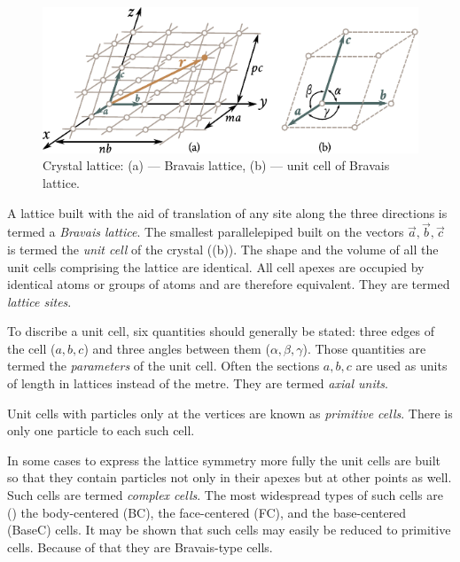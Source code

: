 \begin{figure}[t]
	\begin{center}
		\includegraphics[scale=1]{figures/ch_01/fig_1_11.pdf}
		\caption[]{Crystal lattice: (a) --- Bravais lattice, (b) --- unit cell of Bravais lattice.}
		\label{fig:1_11}
	\end{center}
	\vspace{-0.7cm}
\end{figure}

A lattice built with the aid of translation of any site along the three directions is termed a \textit{Bravais lattice}. The smallest parallelepiped built on the vectors $\vec{a}, \vec{b}, \vec{c}$ is termed the \textit{unit cell} of the crystal ((b)). The shape and the volume of all the unit cells comprising the lattice are identical. All cell apexes are occupied by identical atoms or groups of atoms and are therefore equivalent. They are termed \textit{lattice sites}.

To discribe a unit cell, six quantities should generally be stated: three edges of the cell ($a, b, c$) and three angles between them ($\alpha, \beta, \gamma$). Those quantities are termed the \textit{parameters} of the unit cell. Often the sections $a, b, c$ are used as units of length in lattices instead of the metre. They are termed \textit{axial units}.

Unit cells with particles only at the vertices are known as \textit{primitive cells}. There is only one particle to each such cell.

In some cases to express the lattice symmetry more fully the unit cells are built so that they contain particles not only in their apexes but at other points as well. Such cells are termed \textit{complex cells}. The most widespread types of such cells are () the body-centered (BC), the face-centered (FC), and the base-centered (BaseC) cells. It may be shown that such cells may easily be reduced to primitive cells. Because of that they are Bravais-type cells.

